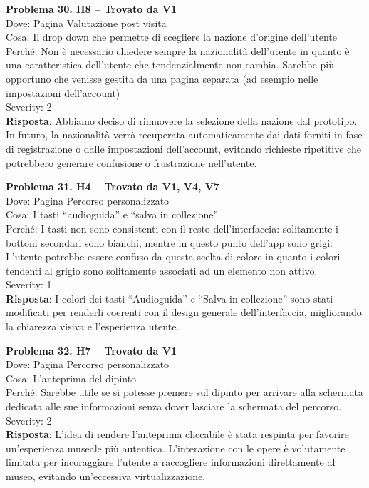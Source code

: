 \documentclass{article}
\begin{document}
\noindent \textbf{Problema 30. H8 – Trovato da V1} \\
Dove: Pagina Valutazione post visita \\
Cosa: Il drop down che permette di scegliere la nazione d’origine dell’utente \\
Perché: Non è necessario chiedere sempre la nazionalità dell’utente in quanto è una caratteristica dell’utente che tendenzialmente non cambia. Sarebbe più opportuno che venisse gestita da una pagina separata (ad esempio nelle impostazioni dell’account) \\
Severity: 2 \\
\textbf{Risposta}: Abbiamo deciso di rimuovere la selezione della nazione dal prototipo. In futuro, la nazionalità verrà recuperata automaticamente dai dati forniti in fase di registrazione o dalle impostazioni dell’account, evitando richieste ripetitive che potrebbero generare confusione o frustrazione nell’utente.

\noindent \textbf{Problema 31. H4 – Trovato da V1, V4, V7} \\
Dove: Pagina Percorso personalizzato \\
Cosa: I tasti “audioguida” e “salva in collezione” \\
Perché: I tasti non sono consistenti con il resto dell’interfaccia: solitamente i bottoni secondari sono bianchi, mentre in questo punto dell’app sono grigi. L’utente potrebbe essere confuso da questa scelta di colore in quanto i colori tendenti al grigio sono solitamente associati ad un elemento non attivo. \\
Severity: 1 \\
\textbf{Risposta}: I colori dei tasti “Audioguida” e “Salva in collezione” sono stati modificati per renderli coerenti con il design generale dell’interfaccia, migliorando la chiarezza visiva e l’esperienza utente.

\noindent \textbf{Problema 32. H7 – Trovato da V1} \\
Dove: Pagina Percorso personalizzato \\
Cosa: L’anteprima del dipinto \\
Perché: Sarebbe utile se si potesse premere sul dipinto per arrivare alla schermata dedicata alle sue informazioni senza dover lasciare la schermata del percorso. \\
Severity: 2 \\
\textbf{Risposta}: L’idea di rendere l’anteprima cliccabile è stata respinta per favorire un’esperienza museale più autentica. L’interazione con le opere è volutamente limitata per incoraggiare l’utente a raccogliere informazioni direttamente al museo, evitando un’eccessiva virtualizzazione.
\end{document}

